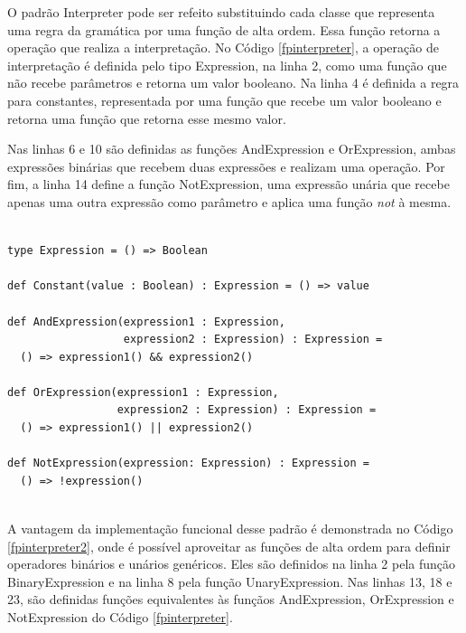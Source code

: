 O padrão Interpreter pode ser refeito substituindo 
cada classe que representa uma regra da gramática 
por uma função de alta ordem. Essa função retorna a 
operação que realiza a interpretação. No Código 
\ref{fpinterpreter}, a operação de interpretação 
é definida pelo tipo Expression, na linha 2, como 
uma função que não recebe parâmetros e retorna um 
valor booleano. Na linha 4 é definida a regra para 
constantes, representada por uma função que recebe 
um valor booleano e retorna uma função que retorna 
esse mesmo valor.

Nas linhas 6 e 10 são definidas as funções 
AndExpression e OrExpression, ambas expressões 
binárias que recebem duas expressões e realizam 
uma operação. Por fim, a linha 14 define a função 
NotExpression, uma expressão unária que recebe 
apenas uma outra expressão como parâmetro e 
aplica uma função \textit{not} à mesma.

\begin{lstlisting}[caption={Interpreter Funcional.},label=fpinterpreter]
    
type Expression = () => Boolean

def Constant(value : Boolean) : Expression = () => value
  
def AndExpression(expression1 : Expression,
                  expression2 : Expression) : Expression =
  () => expression1() && expression2()
  
def OrExpression(expression1 : Expression,
                 expression2 : Expression) : Expression =
  () => expression1() || expression2()
  
def NotExpression(expression: Expression) : Expression =
  () => !expression()
    
\end{lstlisting}

A vantagem da implementação funcional desse 
padrão é demonstrada no Código \ref{fpinterpreter2}, 
onde é possível aproveitar as funções de alta 
ordem para definir operadores binários e unários 
genéricos. Eles são definidos na linha 2 pela função 
BinaryExpression e na linha 8 pela função 
UnaryExpression. Nas linhas 13, 18 e 23, são 
definidas funções equivalentes às funçãos 
AndExpression, OrExpression e NotExpression do 
Código \ref{fpinterpreter}.

